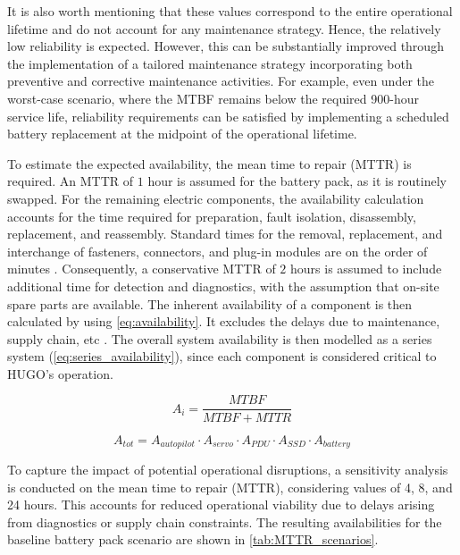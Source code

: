 It is also worth mentioning that these values correspond to the entire operational lifetime and do not account for any maintenance strategy. Hence, the relatively low reliability is expected. However, this can be substantially improved through the implementation of a tailored maintenance strategy incorporating both preventive and corrective maintenance activities. For example, even under the worst-case scenario, where the MTBF remains below the required 900-hour service life, reliability requirements can be satisfied by implementing a scheduled battery replacement at the midpoint of the operational lifetime.

To estimate the expected availability, the mean time to repair (MTTR) is required. An MTTR of $1$ hour is assumed for the battery pack, as it is routinely swapped. For the remaining electric components, the availability calculation accounts for the time required for preparation, fault isolation, disassembly, replacement, and reassembly. Standard times for the removal, replacement, and interchange of fasteners, connectors, and plug-in modules are on the order of minutes \cite{milhdbk472}. Consequently, a conservative MTTR of $2$ hours is assumed to include additional time for detection and diagnostics, with the assumption that on-site spare parts are available. The inherent availability of a component is then calculated by using \autoref{eq:availability}. It excludes the delays due to maintenance, supply chain, etc \cite{milhdbk470a}. The overall system availability is then modelled as a series system (\autoref{eq:series_availability}), since each component is considered critical to HUGO's operation.

\begin{equation}
    A_i = \frac{MTBF}{MTBF + MTTR}
    \label{eq:availability}
\end{equation}

\begin{equation}
    A_{tot} = A_{autopilot} \cdot A_{servo} \cdot A_{PDU} \cdot A_{SSD} \cdot A_{battery}
    \label{eq:series_availability}
\end{equation}


To capture the impact of potential operational disruptions, a sensitivity analysis is conducted on the mean time to repair (MTTR), considering values of 4, 8, and 24 hours. This accounts for reduced operational viability due to delays arising from diagnostics or supply chain constraints. The resulting availabilities for the baseline battery pack scenario are shown in \autoref{tab:MTTR_scenarios}.


